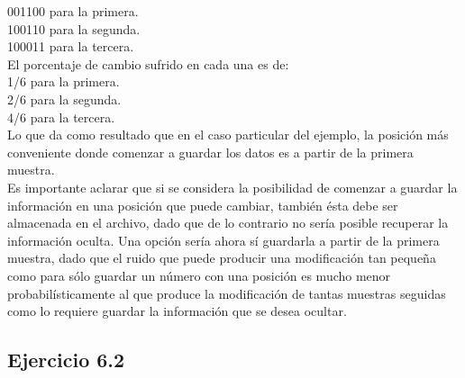 \documentclass{article}
\begin{document}
001100 para la primera.\\
100110 para la segunda.\\
100011 para la tercera.\\
El porcentaje de cambio sufrido en cada una es de: \\
1/6 para la primera.\\
2/6 para la segunda.\\
4/6 para la tercera.\\
Lo que da como resultado que en el caso particular del ejemplo, la posición más conveniente donde comenzar a guardar los datos es a partir de la primera muestra.\\
Es importante aclarar que si se considera la posibilidad de comenzar a guardar la información en una posición que puede cambiar, también ésta debe ser almacenada en el archivo, dado que de lo contrario no sería posible recuperar la información oculta. Una opción sería ahora sí guardarla a partir de la primera muestra, dado que el ruido que puede producir una modificación tan pequeña como para sólo guardar un número con una posición es mucho menor probabilísticamente al que produce la modificación de tantas muestras seguidas como lo requiere guardar la información que se desea ocultar.

\subsection{Ejercicio 6.2}
\end{document}
